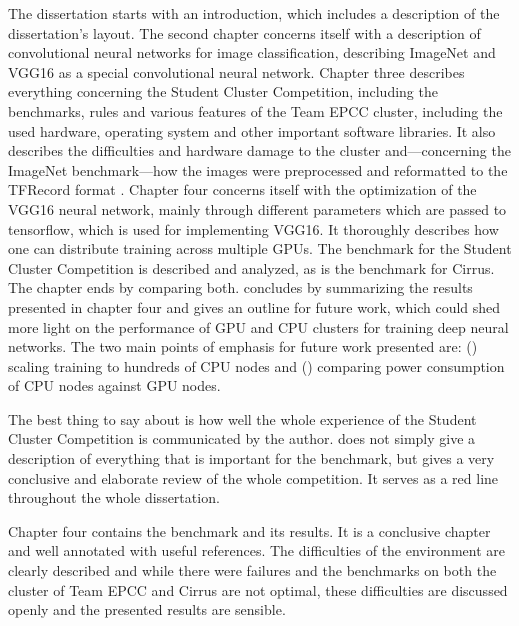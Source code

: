 \documentclass{article}
\begin{document}
The dissertation starts with an introduction, which
includes a description of the dissertation's layout.
The second chapter concerns itself with a description of
convolutional neural networks for image classification,
describing ImageNet and VGG16 as a special convolutional
neural network.
Chapter three describes everything concerning the Student
Cluster Competition, including the benchmarks, rules and
various features of the Team EPCC cluster, including the
used hardware, operating system and other important
software libraries.
It also describes the difficulties and hardware damage to
the cluster and---concerning the ImageNet benchmark---how
the images were preprocessed and reformatted to the
TFRecord format \citep{tf2015}.
Chapter four concerns itself with the optimization of the
VGG16 neural network, mainly through different parameters
which are passed to tensorflow, which is used for
implementing VGG16.
It thoroughly describes how one can distribute training
across multiple GPUs.
The benchmark for the Student Cluster Competition is
described and analyzed, as is the benchmark for Cirrus.
The chapter ends by comparing both.
\citet{nita_2018} concludes by summarizing the results
presented in chapter four and gives an outline for future
work, which could shed more light on the performance of
GPU and CPU clusters for training deep neural networks.
The two main points of emphasis for future work presented
are: () scaling training to hundreds of
CPU nodes \citep[see e.g.][for distributing training onto
multiple CPUs]{you2017} and ()
comparing power consumption of CPU nodes against GPU nodes.

The best thing to say about \citet{nita_2018} is how well
the whole experience of the Student Cluster Competition is
communicated by the author.
\citet{nita_2018} does not simply give a description of
everything that is important for the benchmark, but gives
a very conclusive and elaborate review of the whole
competition.
It serves as a red line throughout the whole dissertation.

Chapter four contains the benchmark and its results.
It is a conclusive chapter and well annotated with useful
references.
The difficulties of the environment are clearly described
and while there were failures and the benchmarks on both
the cluster of Team EPCC and Cirrus are not optimal, these
difficulties are discussed openly and the presented results
are sensible.
\end{document}
